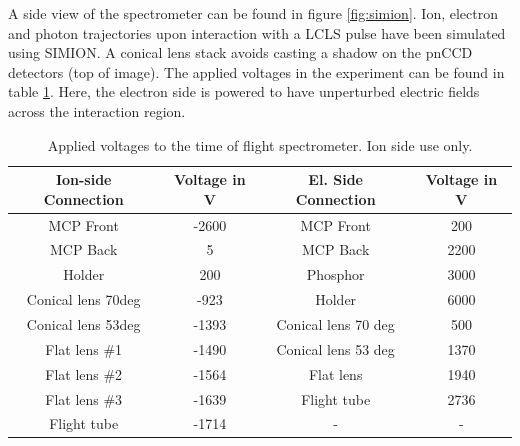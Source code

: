 A side view of the spectrometer can be found in figure \ref{fig:simion}. Ion, electron and photon trajectories upon interaction with a LCLS pulse have been simulated using SIMION. A conical lens stack avoids casting a shadow on the pnCCD detectors (top of image). The applied voltages in the experiment can be found in table \ref{tab:tof-volategs}. Here, the electron side is powered to have unperturbed electric fields across the interaction region.
\begin{table}
\centering
\begin{tabular}{ | c | c || c | c | }
\hline
	\textbf{Ion-side Connection} & \textbf{Voltage in V} & \textbf{El. Side Connection} & \textbf{Voltage in V} \\ \hline
	MCP Front & -2600 & MCP Front & 200 \\ \hline
	MCP Back & 5 & MCP Back & 2200 \\ \hline
	Holder & 200 & Phosphor & 3000 \\ \hline
	Conical lens 70deg & -923 & Holder & 6000 \\ \hline
	Conical lens 53deg & -1393 & Conical lens 70 deg & 500 \\ \hline
	Flat lens \#1 & -1490 & Conical lens 53 deg & 1370 \\ \hline
	Flat lens \#2 & -1564 & Flat lens & 1940 \\ \hline
	Flat lens \#3 & -1639 & Flight tube & 2736 \\ \hline
	Flight tube & -1714 & - & - \\ \hline
\end{tabular}
\caption{Applied voltages to the time of flight spectrometer. Ion side use only.}
\label{tab:tof-volategs}
\end{table}
%
%
%